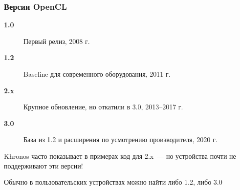 \documentclass[
    aspectratio=169,
]{beamer}
\begin{document}
\begin{frame}
    \frametitle{Версии OpenCL}

    \begin{description}
        \item[\textbf{1.0}] Первый релиз, 2008 г.
        \item[\textbf{1.2}] Baseline для современного оборудования, 2011 г.
        \item[\textbf{2.x}] Крупное обновление, но откатили в 3.0, 2013--2017 г.
        \item[\textbf{3.0}] База из 1.2 и расширения по усмотрению производителя, 2020 г.
    \end{description}
    \vspace{1em}
    Khronos часто показывает в примерах код для 2.x~--- но устройства почти не поддерживают эти версии!

    \vspace{1em}
    Обычно в пользовательских устройствах можно найти либо 1.2, либо 3.0
\end{frame}
\end{document}
